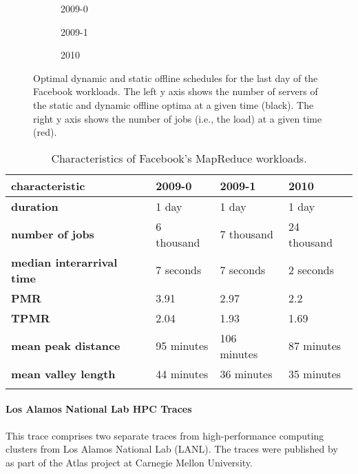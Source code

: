 \begin{figure}
    \begin{subfigure}[b]{.33\linewidth}
    \resizebox{\textwidth}{!}{}
    \caption{2009-0}
    \end{subfigure}
    \begin{subfigure}[b]{.3075\linewidth}
    \resizebox{\textwidth}{!}{}
    \caption{2009-1}
    \end{subfigure}
    \begin{subfigure}[b]{.3475\linewidth}
    \resizebox{\textwidth}{!}{}
    \caption{2010}
    \end{subfigure}
    \caption{Optimal dynamic and static offline schedules for the last day of the Facebook workloads. The left y axis shows the number of servers of the static and dynamic offline optima at a given time (black). The right y axis shows the number of jobs (i.e., the load) at a given time (red).}
    \label{fig:facebook:schedule}
\end{figure}

\begin{table}
    \centering
    \begin{tabularx}{\textwidth}{>{\bfseries}l|X|X|X}
        characteristic & 2009-0 & 2009-1 & 2010 \\\hline
        duration & 1 day & 1 day & 1 day \\
        number of jobs & 6 thousand & 7 thousand & 24 thousand \\
        median interarrival time & 7 seconds & 7 seconds & 2 seconds \\
        PMR & 3.91 & 2.97 & 2.2 \\
        TPMR & 2.04 & 1.93 & 1.69 \\
        mean peak distance & 95 minutes & 106 minutes & 87 minutes \\
        mean valley length & 44 minutes & 36 minutes & 35 minutes \\
    \caption{Characteristics of Facebook's MapReduce workloads.}
    \end{tabularx}
    \label{tab:facebook}
\end{table}

\paragraph{Los Alamos National Lab HPC Traces~\cite{Amvrosiadis2018_3, Amvrosiadis2018, Amvrosiadis2018_2}} This trace comprises two separate traces from high-performance computing clusters from Los Alamos National Lab (LANL). The traces were published by \citeauthor*{Amvrosiadis2018}~\cite{Amvrosiadis2018} as part of the Atlas project at Carnegie Mellon University.

